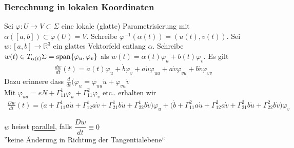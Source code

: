 \documentclass[../main.tex]{subfiles}
\begin{document}
\subsubsection*{Berechnung in lokalen Koordinaten}
Sei $\varphi : U \to V \subset \Sigma$ eine lokale (glatte) Parametrisierung mit $\alpha([a,b]) \subset \varphi (U) = V$. Schreibe $\varphi^{-1}(\alpha(t))=(u(t),v(t))$.
Sei $w:[a,b]\to \mathbb{R}^3$ ein glattes Vektorfeld entlang $\alpha$. Schreibe $w(t) \in T_{\alpha(t)}\Sigma = \operatorname{span} \{ \varphi_u, \varphi_v \}$
als $w(t) = \alpha(t)\varphi_u + b(t)\varphi_v$. Es gilt
\begin{align*}
    \frac{dw}{dt}(t) = \dot{a}(t)\varphi_u + \dot{b}\varphi_v + a\dot{u}\varphi_{uu} + a\dot{v}\varphi_{vu} + b\dot{v}\varphi_{vv}
\end{align*}
Dazu erinnere dass $\frac{d}{dt}(\varphi_u = \varphi_{uu}\dot{u} + \varphi_{vu}\dot{v}$
\\
Mit $\varphi_{uu} = eN + \Gamma^1_{11}\varphi_u + \Gamma^2_{11}\varphi_v$ etc.. erhalten wir
\begin{align*}
    \frac{Dw}{dt}(t) = \big(\dot{a} + \Gamma^1_{11}a\dot{u} + \Gamma^1_{12}a\dot{v} + \Gamma^1_{21}b\dot{u} + \Gamma^1_{22}b\dot{v}\big) \varphi_u + \big(\dot{b} + \Gamma^2_{11}a\dot{u} + \Gamma^2_{12}a\dot{v} + \Gamma^2_{21}b\dot{u} + \Gamma^2_{22}b\dot{v}\big) \varphi_v
\end{align*}

\begin{definition}
$w$ heisst \underline{parallel}, falls $\dfrac{Dw}{dt} \equiv 0$ \\ ''keine Änderung in Richtung der Tangentialebene``
\end{definition}
\end{document}
